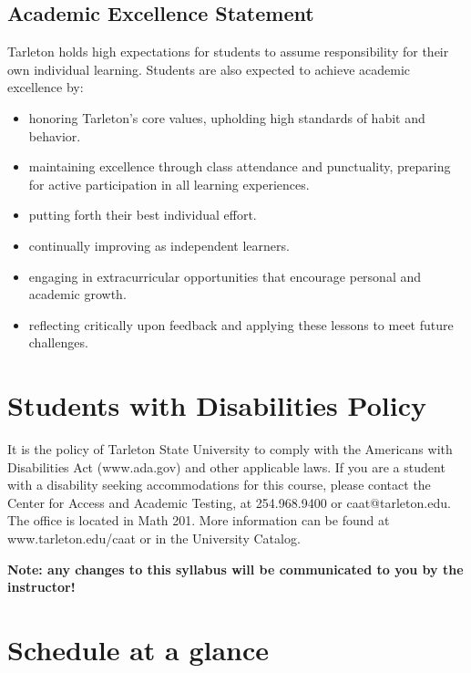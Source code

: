 \documentclass[10pt]{article}
\begin{document}
\subsection*{Academic Excellence Statement}
\label{sec:org992decd}
Tarleton holds high expectations for students to assume responsibility for their own individual learning. Students are also expected to achieve academic excellence by:
\begin{itemize}
\item honoring Tarleton’s core values, upholding high standards of habit and behavior.
\item maintaining excellence through class attendance and punctuality, preparing for active participation in all learning experiences.
\item putting forth their best individual effort.
\item continually improving as independent learners.
\item engaging in extracurricular opportunities that encourage personal and academic growth.
\item reflecting critically upon feedback and applying these lessons to meet future challenges.
\end{itemize}

\section*{Students with Disabilities Policy}
\label{sec:org73cb26e}

It is the policy of Tarleton State University to comply with the Americans with Disabilities  Act (www.ada.gov) and other applicable laws.  If you are a student with a disability seeking accommodations for this course, please contact the Center for Access and Academic Testing, at 254.968.9400 or caat@tarleton.edu. The office is located in Math 201. More information can be found at www.tarleton.edu/caat or in the University Catalog.​

\textbf{Note:  any changes to this syllabus will be communicated to you by the instructor!}

\section*{Schedule at a glance}
\label{sec:org7ed4012}
\end{document}
